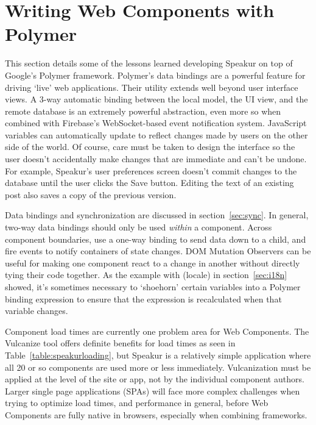 \section{Writing Web Components with Polymer}
This section details some of the lessons learned developing Speakur on top of Google's Polymer framework.
Polymer's data bindings are a powerful feature for driving `live' web applications.
Their utility extends well beyond user interface views.
A 3-way automatic binding between the local model, the UI view, and the remote database is an extremely powerful abstraction,
even more so when combined with Firebase's 
Web\-Socket-based event notification system.
JavaScript variables can automatically update to reflect changes made by users on the other side of the world.
Of course, care must be taken to design the interface so the user doesn't accidentally make changes that are immediate and can't be undone. 
For example, Speakur's user preferences screen doesn't commit changes to the database until the user clicks the Save button.
Editing the text of an existing post also saves a copy of the previous version.

Data bindings and synchronization are discussed in section~\ref{sec:sync}.
In general, two-way data bindings should only be used \textit{within} a component.
Across component boundaries, use a one-way binding to send data down to a child,
and fire events to notify containers of state changes.
DOM Mutation Observers can be useful for making one component react to a change in another without directly tying their code together.
As the example with  (locale) in section~\ref{sec:i18n} showed, 
it's sometimes necessary to `shoehorn' certain variables into a Polymer binding expression 
to ensure that the expression is recalculated when that variable changes.

Component load times are currently one problem area for Web Components.
The Vulcanize tool offers definite benefits for load times as seen in Table~\ref{table:speakurloading},
but Speakur is a relatively simple application where all 20 or so components are used more or less immediately.
Vulcanization must be applied at the level of the site or app, not by the individual component authors.
Larger single page applications (SPAs) will face more complex challenges when trying to optimize load times, and performance in general,
before Web Components are fully native in browsers, especially when combining frameworks.

